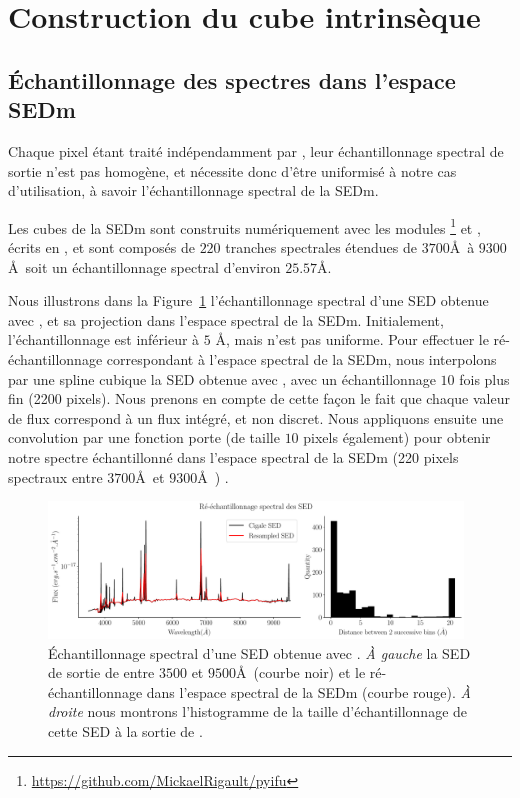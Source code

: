 \documentclass[../main/main.tex]{subfiles}
\begin{document}
\section{Construction du cube intrinsèque}\label{sec:intcube}

\subsection{\'Echantillonnage des spectres dans l'espace SEDm}

Chaque pixel étant traité indépendamment par \cigale, leur échantillonnage
spectral de sortie n'est pas homogène, et nécessite donc d'être uniformisé à
notre cas d'utilisation, à savoir l'échantillonnage spectral de la SEDm.

Les cubes de la SEDm sont construits numériquement avec les modules
\footnote{\url{https://github.com/MickaelRigault/pyifu}} et
, écrits en , et sont composés de $220$ tranches spectrales
étendues de $3700$\AA\ à $9300$\AA\, soit un échantillonnage spectral
d'environ $25.57$\AA.

Nous illustrons dans la Figure~\ref{fig:cigalesampling}
l'échantillonnage spectral d'une SED obtenue avec \cigale, et sa
projection dans l'espace spectral de la SEDm.
Initialement, l'échantillonnage est inférieur à
$5$ \AA, mais n'est pas uniforme. Pour effectuer le ré-échantillonnage
correspondant à l'espace spectral de la SEDm, nous interpolons par une
spline cubique la SED obtenue avec , avec un échantillonnage $10$
fois plus fin (2200 pixels).
Nous prenons en compte de cette façon le fait que chaque valeur de flux correspond à un
flux intégré, et non discret. 
Nous appliquons ensuite une convolution par une fonction porte (de
taille $10$ pixels également) pour
obtenir notre spectre échantillonné dans l'espace spectral de la SEDm (220 pixels
spectraux entre $3700$\AA\ et $9300$\AA\ ) .

\begin{figure}[ht]
  \centering
  \includegraphics[width=0.98\textwidth]{../figures/05_sedfit/cigalesampling.pdf}
  \caption[\'Echantillonnage spectral d'une SED obtenue avec
  \cigale]{\'Echantillonnage spectral d'une SED obtenue avec \cigale. \textit{À
    gauche} la SED de sortie de \cigale entre $3500$ et $9500$\AA\ 
    (courbe noir) et le ré-échantillonnage dans l'espace spectral de la SEDm
    (courbe rouge). \textit{À droite} nous montrons l'histogramme
    de la taille d'échantillonnage de cette SED à la sortie de \cigale.}\label{fig:cigalesampling}
\end{figure}
\end{document}
